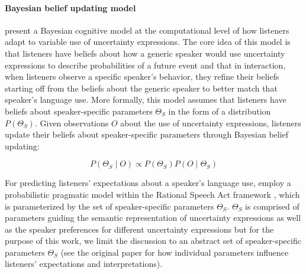 \documentclass[man,floatsintext]{apa6}
\begin{document}
\paragraph{Bayesian belief updating model}  present a Bayesian cognitive model at the computational level \cite{Marr1982,Anderson1990} of how listeners adapt to variable use of uncertainty expressions. The core idea of this model is that listeners have beliefs about how a generic speaker would use uncertainty expressions to describe probabilities of a future event and that in interaction, when listeners observe a specific speaker's behavior, they refine their beliefs starting off from the beliefs about the generic speaker to better match that speaker's language use. More formally, this model assumes that listeners have beliefs about speaker-specific parameters $\Theta_S$ in the form of a distribution $P(\Theta_S)$. Given observations $O$ about the use of uncertainty expressions, listeners update their beliefs about speaker-specific parameters through Bayesian belief updating:

$$ P(\Theta_S \mid O) \propto P(\Theta_S) P(O \mid \Theta_S) $$

For predicting listeners' expectations about a speaker's language use,  employ a probabilistic pragmatic model within the Rational Speech Act framework \cite{Goodman2016}, which is parameterized by the set of speaker-specific parameters $\Theta_S$. $\Theta_S$ is comprised of parameters guiding the semantic representation of uncertainty expressions as well as the speaker preferences for different uncertainty expressions but for the purpose of this work, we limit the discussion to an abstract set of speaker-specific parameters $\Theta_S$ (see the original paper for how individual parameters influence listeners' expectations and interpretations).
\end{document}
